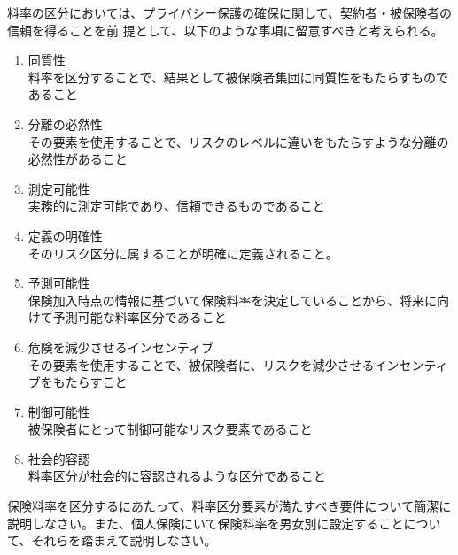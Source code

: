 \documentclass[report,gutter=10mm,fore-edge=10mm,uplatex,dvipdfmx]{jlreq}
\begin{document}
料率の区分においては、プライバシー保護の確保に関して、契約者・被保険者の信頼を得ることを前
提として、以下のような事項に留意すべきと考えられる。

\begin{enumerate}
\tightlist
\item
  同質性\\
  料率を区分することで、結果として被保険者集団に同質性をもたらすものであること
\item
  分離の必然性\\
  その要素を使用することで、リスクのレベルに違いをもたらすような分離の必然性があること
\item
  測定可能性\\ 実務的に測定可能であり、信頼できるものであること
\item
  定義の明確性\\ そのリスク区分に属することが明確に定義されること。
\item
  予測可能性\\
  保険加入時点の情報に基づいて保険料率を決定していることから、将来に向けて予測可能な料率区分であること
\item
  危険を減少させるインセンティブ\\
  その要素を使用することで、被保険者に、リスクを減少させるインセンティブをもたらすこと
\item
  制御可能性\\ 被保険者にとって制御可能なリスク要素であること
\item
  社会的容認\\ 料率区分が社会的に容認されるような区分であること
\end{enumerate}



保険料率を区分するにあたって、料率区分要素が満たすべき要件について簡潔に説明しなさい。また、個人保険にいて保険料率を男女別に設定することについて、それらを踏まえて説明しなさい。

\end{document}
